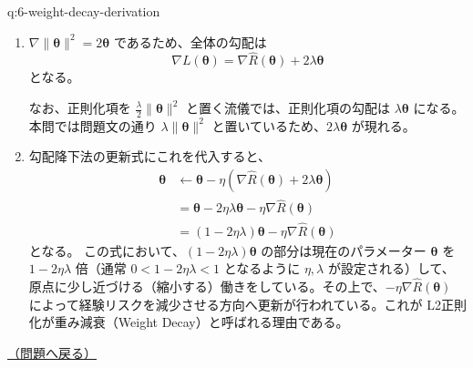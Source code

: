 \documentclass[
  pandoc]{bxjsarticle}
\begin{document}
\begin{answerbox}[phantomlabel=a:6-weight-decay-derivation]{q:6-weight-decay-derivation}

\begin{enumerate}
\def\labelenumi{\arabic{enumi}.}
\item
  \(\nabla \|\boldsymbol{\theta}\|^2 = 2\boldsymbol{\theta}\)
  であるため、全体の勾配は
  \[ \nabla L(\boldsymbol{\theta}) = \nabla \hat{R}(\boldsymbol{\theta}) + 2\lambda \boldsymbol{\theta} \]
  となる。

  なお、正則化項を \(\frac{\lambda}{2}\|\boldsymbol{\theta}\|^2\)
  と置く流儀では、正則化項の勾配は \(\lambda\boldsymbol{\theta}\)
  になる。本問では問題文の通り \(\lambda\|\boldsymbol{\theta}\|^2\)
  と置いているため、\(2\lambda\boldsymbol{\theta}\) が現れる。
\item
  勾配降下法の更新式にこれを代入すると、 \begin{align*}
  \boldsymbol{\theta} &\leftarrow \boldsymbol{\theta} - \eta \left( \nabla \hat{R}(\boldsymbol{\theta}) + 2\lambda \boldsymbol{\theta} \right) \\
  &= \boldsymbol{\theta} - 2\eta\lambda \boldsymbol{\theta} - \eta \nabla \hat{R}(\boldsymbol{\theta}) \\
  &= (1 - 2\eta\lambda) \boldsymbol{\theta} - \eta \nabla \hat{R}(\boldsymbol{\theta})
  \end{align*} となる。
  この式において、\((1 - 2\eta\lambda) \boldsymbol{\theta}\)
  の部分は現在のパラメーター \(\boldsymbol{\theta}\) を
  \(1 - 2\eta\lambda\) 倍（通常 \(0 < 1 - 2\eta\lambda < 1\)
  となるように \(\eta, \lambda\)
  が設定される）して、原点に少し近づける（縮小する）働きをしている。その上で、\(-\eta \nabla \hat{R}(\boldsymbol{\theta})\)
  によって経験リスクを減少させる方向へ更新が行われている。これが
  L2正則化が重み減衰（Weight Decay）と呼ばれる理由である。
\end{enumerate}

\hfill 

\hyperref[q:6-weight-decay-derivation]{（問題へ戻る）}

\end{answerbox}
\end{document}
